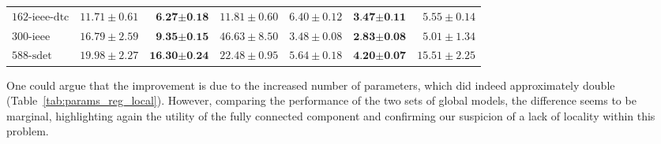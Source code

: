 \documentclass[journal]{IEEEtran}
\begin{document}
\begin{table*}[!ht]
\begin{tabular}{lrrr|rrr}
    $\textrm{162-ieee-dtc}$ & $11.71 \pm 0.61$ & $\textbf{6.27} \boldsymbol{\pm} \textbf{0.18}$ & $11.81 \pm 0.60$ & $6.40 \pm 0.12$ & $\textbf{3.47} \boldsymbol{\pm} \textbf{0.11}$ & $5.55 \pm 0.14$ \\
    $\textrm{300-ieee}$ & $16.79 \pm 2.59$ & $\textbf{9.35} \boldsymbol{\pm} \textbf{0.15}$ & $46.63 \pm 8.50$ & $3.48 \pm 0.08$ & $\textbf{2.83} \boldsymbol{\pm} \textbf{0.08}$ & $5.01 \pm 1.34$ \\
    $\textrm{588-sdet}$ & $19.98 \pm 2.27$ & $\textbf{16.30} \boldsymbol{\pm} \textbf{0.24}$ & $22.48 \pm 0.95$ & $5.64 \pm 0.18$ & $\textbf{4.20} \boldsymbol{\pm} \textbf{0.07}$ & $15.51 \pm 2.25$ \\
    \bottomrule
    \end{tabular}
\end{table*}

One could argue that the improvement is due to the increased number of parameters, which did indeed approximately double (Table~\ref{tab:params_reg_local}).
However, comparing the performance of the two sets of global models, the difference seems to be marginal, highlighting again the utility of the fully connected component and confirming our suspicion of a lack of locality within this problem.
\end{document}
